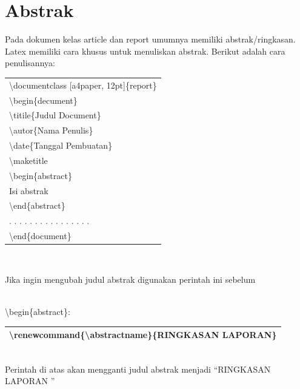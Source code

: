 \section{Abstrak}
Pada dokumen kelas article dan report umumnya memiliki abstrak/ringkasan. Latex memiliki cara khusus untuk menuliskan abstrak. Berikut adalah cara penulisannya:\\
\begin{tabular}{|p{13.5 cm}|}
\hline
 \textbackslash  documentclass [a4paper, 12pt]\{report\}\\
 \textbackslash  begin\{decument\} \\
         \textbackslash  titile\{Judul Document\} \\
         \textbackslash  autor\{Nama Penulis\} \\
         \textbackslash  date\{Tanggal Pembuatan\}\\
         \textbackslash maketitle \\

         \textbackslash begin\{abstract\}\\
             Isi abstrak\\
         \textbackslash end\{abstract\}\\
. . . . . . . . . . . . . . . . \\
\textbackslash end\{document\}\\

\hline

\end{tabular}\\[0.5 cm]
\begin{raggedleft}Jika ingin mengubah judul abstrak digunakan perintah ini sebelum \end{raggedleft}\\  \textbackslash begin\{abstract\}:\\[0.5 cm]
\begin{tabular}{|p{13.5 cm}|}
\hline
\textbackslash renewcommand\{\textbackslash abstractname\}\{RINGKASAN LAPORAN\}\\
\hline
\end{tabular}\\[0.5 cm]
Perintah di atas akan mengganti judul abstrak menjadi \textquotedblleft RINGKASAN LAPORAN \textquotedblright
